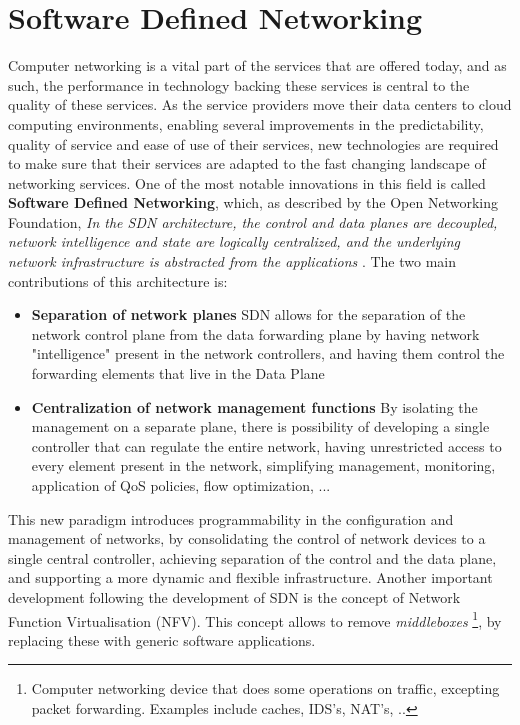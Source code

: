 \section{Software Defined Networking} \label{chap:sdn} %

Computer networking is a vital part of the services that are offered today, and as such, the performance in technology backing these services is central to the
quality of these services. As the service providers move their data centers to cloud computing environments, enabling several improvements in the predictability,
quality of service and ease of use of their services, new technologies are required to make sure that their services are adapted to the fast changing landscape of 
networking services. One of the most notable innovations in this field is called \textbf{Software Defined Networking}, which, as described by the Open Networking
Foundation, \textit{ In the SDN architecture, the control and data planes are decoupled, network intelligence and state are logically centralized, and the underlying
network infrastructure is abstracted from the applications} \cite{open_networking_foundation_sdn_2014}. 
The two main contributions of this architecture is:

\begin {itemize}
    \item \textbf{Separation of network planes} SDN allows for the separation of the network control plane from the data forwarding plane by having network
        "intelligence" present in the network controllers, and having them control the forwarding elements that live in the Data Plane
    \item \textbf{Centralization of network management functions} By isolating the management on a separate plane, there is possibility of developing a single
        controller that can regulate the entire network, having unrestricted access to every element present in the network, simplifying management, monitoring,
        application of QoS policies, flow optimization, ...
\end {itemize}

\par This new paradigm introduces programmability in the configuration and management of networks, by consolidating the control of network devices to a single
central controller, achieving separation of the control and the data plane, and supporting a more dynamic and flexible infrastructure. Another important development
following the development of SDN is the concept of Network Function Virtualisation (NFV). This concept allows to remove \textit {middleboxes}
\footnote {Computer networking device that does some operations on traffic, excepting packet forwarding. Examples include caches, IDS's, NAT's, ..}, by replacing
these with generic software applications.

